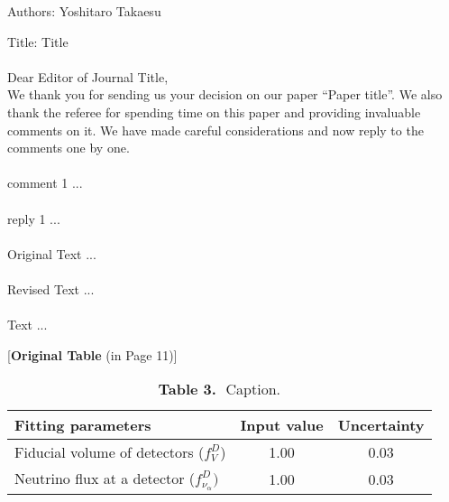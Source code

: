 \documentclass[a4paper,11pt]{article}
\begin{document}

\noindent Authors: Yoshitaro Takaesu

\noindent Title: Title \\\\

\noindent Dear Editor of Journal Title,\\

\noindent We thank you for sending us your decision on our paper ``Paper
title''.
We also thank the referee for spending time on this paper and
providing invaluable comments on it. We have made careful considerations
and now reply to the comments one by one.
\\

\\
comment 1 ...
\\

\\
reply 1 ...
\\

\\
Original Text ...
\\

\\
Revised Text ...
\\
\\

\noindent Text ... 
\\

\clearpage
\begin{table}[t]
\begin{center}
\caption*{[{\bf Original Table} (in Page 11)]}
\begin{tabular}{lcc}
\hline\hline\addlinespace[2 pt]
Fitting parameters  & Input value & Uncertainty\\[2 pt]
\hline\addlinespace[2 pt]
Fiducial volume of detectors ($f_V^D$) & 1.00 & 0.03 \\
Neutrino flux at a detector ($f_{\nu_{\alpha}}^D)$ & 1.00 & 0.03 \\
\hline\hline
\end{tabular}
\end{center}
\caption*{{\bf Table 3.} \,\,Caption.}
\label{tb:parameters}
\end{table}
\end{document}
